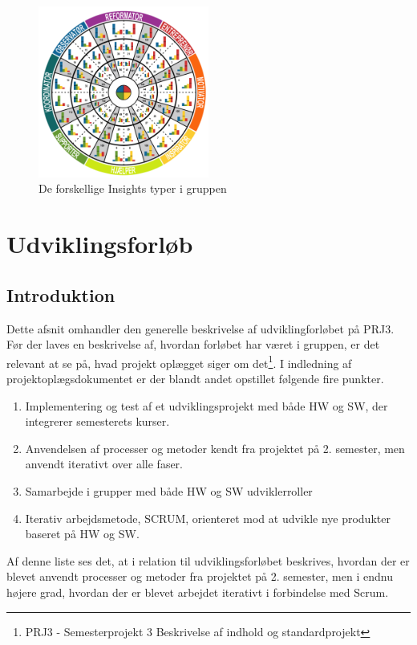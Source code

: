 \documentclass[a4paper,12pt,fleqn,oneside]{article}
\begin{document}
\begin{figure}[H]
    \centering
    \includegraphics[width=0.5\textwidth]{Processdokument/graphics/type_cirkel.png}
    \caption{De forskellige Insights typer i gruppen}
    \label{fig:group_types}
\end{figure}

\section{Udviklingsforløb}
\subsection{Introduktion}
Dette afsnit omhandler den generelle beskrivelse af udviklingforløbet på PRJ3. Før der laves en beskrivelse af, hvordan forløbet har været i gruppen, er det relevant at se på, hvad projekt oplægget siger om det\footnote{PRJ3 - Semesterprojekt 3
Beskrivelse af indhold og standardprojekt}. I indledning af projektoplægsdokumentet er der blandt andet opstillet følgende fire punkter.
\begin{enumerate}
    \item Implementering og test af et udviklingsprojekt med både HW og SW, der integrerer semesterets kurser.
    \item Anvendelsen af processer og metoder kendt fra projektet på 2. semester, men anvendt iterativt over alle faser.
    \item Samarbejde i grupper med både HW og SW udviklerroller
    \item Iterativ arbejdsmetode, SCRUM, orienteret mod at udvikle nye produkter baseret på HW og SW.
\end{enumerate}
Af denne liste ses det, at i relation til udviklingsforløbet beskrives, hvordan der er blevet anvendt processer og metoder fra projektet på 2. semester, men i endnu højere grad, hvordan der er blevet arbejdet iterativt i forbindelse med Scrum.
\end{document}
